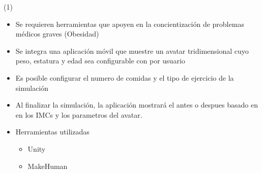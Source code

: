 



\begin{frame}{ \footnotemark (1)}
	\begin{itemize}
\item Se requieren herramientas que apoyen en la concientización de problemas médicos graves (Obesidad)
\item Se integra una aplicación móvil que muestre un avatar tridimensional cuyo peso, estatura y edad sea configurable con por usuario
\item Es posible configurar el numero de comidas y el tipo de ejercicio de la simulación
\item Al finalizar la simulación, la aplicación mostrará el antes o despues basado en en los IMCs y los parametros del avatar. 
\item Herramientas utilizadas
	\begin{itemize}
		\item Unity
		\item MakeHuman 
	\end{itemize}
	\end{itemize}
\setcounter{footnote}{0}
\end{frame}

